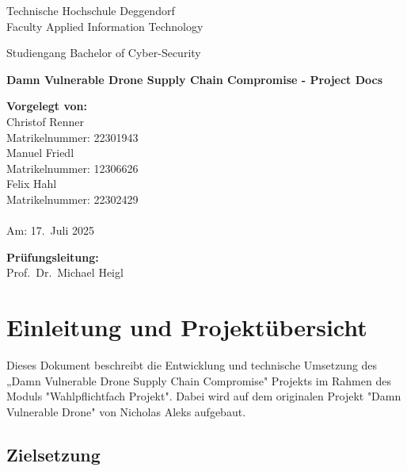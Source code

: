 \documentclass[12pt]{scrartcl}
\newcommand{\faculty}{Faculty Applied Information Technology}
\newcommand{\studies}{Bachelor of Cyber-Security}
\newcommand{\thesistitleDE}{Damn Vulnerable Drone Supply Chain Compromise - Project Docs}
\newcommand{\submissiondate}{17.\ Juli 2025}
\newcommand{\supervisor}{Prof.\ Dr.\ Michael Heigl}
\begin{document}
    \begin{titlepage}
    \begin{center}
        {\Large Technische Hochschule Deggendorf\\
        \faculty\par}
        \vspace{0.2cm}
        {\Large Studiengang \studies\\}
        \vspace{2\baselineskip}
        {\Huge\bfseries \thesistitleDE\par}
        \vspace{3\baselineskip}
    \end{center}

    \vfill

    \parbox[t]{0.4\textwidth}{
        \textbf{Vorgelegt von:}\\[0.5em]
        Christof Renner\\
        Matrikelnummer: 22301943\\
        Manuel Friedl\\
        Matrikelnummer: 12306626\\
        Felix Hahl\\
        Matrikelnummer: 22302429\\[1em]
        \\
        Am: \submissiondate\par
    }
    \hfill
    \parbox[t]{0.4\textwidth}{
        \textbf{Prüfungsleitung:}\\[0.5em]
        \supervisor
    }
    \end{titlepage}

    \cleardoublepage
    \tableofcontents
    \cleardoublepage

    \section{Einleitung und Projektübersicht}

    Dieses Dokument beschreibt die Entwicklung und technische Umsetzung des „Damn Vulnerable Drone Supply Chain Compromise" Projekts im Rahmen des Moduls "Wahlpflichtfach Projekt". Dabei wird auf dem originalen Projekt "Damn Vulnerable Drone" von Nicholas Aleks aufgebaut.

    \subsection{Zielsetzung}
    
\end{document}
